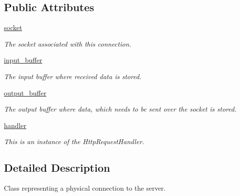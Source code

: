 \subsection*{Public Attributes}
\begin{DoxyCompactItemize}
\item 
\hyperlink{class_connection_manager_1_1_connection_acf891c29169c0404caf1941086ed8ea5}{socket}
\begin{DoxyCompactList}\small\item\em The socket associated with this connection. \end{DoxyCompactList}\item 
\hyperlink{class_connection_manager_1_1_connection_a6363bfbd5eb310be1d9d8f8f3c316a64}{input\-\_\-buffer}
\begin{DoxyCompactList}\small\item\em The input buffer where received data is stored. \end{DoxyCompactList}\item 
\hyperlink{class_connection_manager_1_1_connection_a3dcce4ca0299bef196ffb49ab2795330}{output\-\_\-buffer}
\begin{DoxyCompactList}\small\item\em The output buffer where data, which needs to be sent over the socket is stored. \end{DoxyCompactList}\item 
\hyperlink{class_connection_manager_1_1_connection_a36948dfdd00bb9b1f3d8246c874238a9}{handler}
\begin{DoxyCompactList}\small\item\em This is an instance of the Http\-Request\-Handler. \end{DoxyCompactList}\end{DoxyCompactItemize}


\subsection{Detailed Description}
Class representing a physical connection to the server. 

